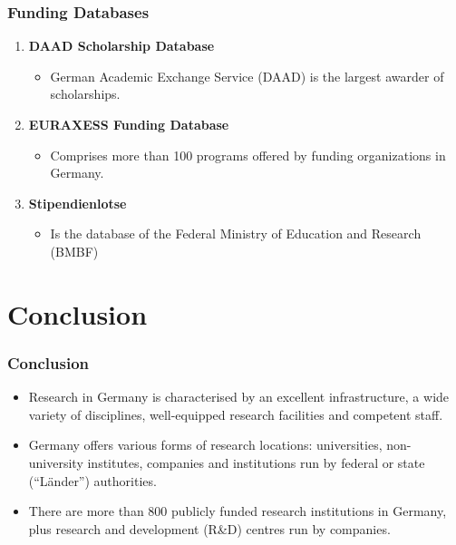\documentclass[9pt, compress]{beamer}
\begin{document}
	\begin{frame} 
		\frametitle{Funding Databases}
		\begin{enumerate}
			\setcounter{enumi}{0}
			\item \textbf{DAAD Scholarship Database}
			\begin{itemize}
				\item German Academic Exchange Service (DAAD) is the largest awarder of scholarships. 
			\end{itemize}
			\item \textbf{EURAXESS Funding Database}
			\begin{itemize}
				\item  Comprises more than 100 programs offered by funding organizations in Germany.
			\end{itemize}
			\item  \textbf{Stipendienlotse}
			\begin{itemize}
				\item Is the database of the Federal Ministry of Education and Research (BMBF) 
			\end{itemize}
		\end{enumerate} 
	\end{frame}
	\section{Conclusion}
	\begin{frame} 
		\frametitle{Conclusion}
		\begin{itemize}
			\item Research in Germany is characterised by an excellent infrastructure, a wide variety of disciplines, well-equipped research facilities and competent staff.\\
			\item Germany offers various forms of research locations: universities, non-university institutes, companies and institutions run by federal or state (“Länder”) authorities.\\
			\item There are more than 800 publicly funded research institutions in Germany, plus research and development (R\&D) centres run by companies.
		\end{itemize}
	\end{frame}
\end{document}
